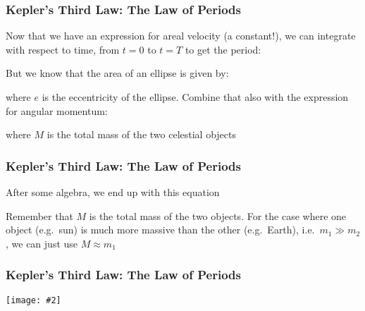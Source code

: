 \documentclass[12pt,compress,aspectratio=169]{beamer}
\newcommand{\pic}[2]{\texttt{[image: \#2]}}
\begin{document}
\begin{frame}
  \frametitle{Kepler's Third Law: The Law of Periods}
  Now that we have an expression for areal velocity (a constant!), we can
  integrate with respect to time, from $t=0$ to $t=T$ to get the period:


  But we know that the area of an ellipse is given by:


  where $e$ is the eccentricity of the ellipse. Combine that also with the
  expression for angular momentum:

  where $M$ is the total mass of the two celestial objects
\end{frame}


\begin{frame}
  \frametitle{Kepler's Third Law: The Law of Periods}

  After some algebra, we end up with this equation


  Remember that $M$ is the total mass of the two objects. For the case where
  one object (e.g.\ sun) is much more massive than the other (e.g.\ Earth),
  i.e.\ $m_1\gg m_2$, we can just use $M\approx m_1$
\end{frame}



\begin{frame}
  \frametitle{Kepler's Third Law: The Law of Periods}
  \begin{center}
    \pic{.65}{kep8.png}
  \end{center}
\end{frame}
\end{document}
